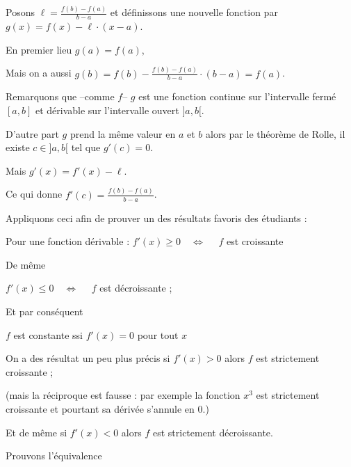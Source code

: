 Posons $\ell= \frac{f(b)-f(a)}{b-a}$ et définissons une nouvelle fonction
par $g(x) = f(x) - \ell \cdot (x-a)$.

\change

En premier lieu  $g(a)=f(a)$, 

\change

Mais on a aussi $g(b)=f(b)- \frac{f(b)-f(a)}{b-a} \cdot (b-a) = f(a)$.

\change

Remarquons que --comme $f$--
$g$ est une fonction continue sur l'intervalle fermé $[a,b]$ 
et dérivable sur l'intervalle ouvert $]a,b[$.


D'autre part $g$ prend la même valeur en $a$ et $b$
alors par le théorème de Rolle, 
il existe $c \in ]a,b[$ tel que $g'(c) =0$.

\change

Mais $g'(x) = f'(x) - \ell$.

\change

Ce qui donne $f'(c)= \frac{f(b)-f(a)}{b-a}$.  


\diapo

\change

Appliquons ceci afin de prouver un des résultats favoris des étudiants :

Pour une fonction dérivable :
$f'(x) \ge 0 \quad \iff \quad$ $f$ est croissante 

\change

De même 

 $f'(x) \le 0 \quad \iff \quad$ $f$ est décroissante ;

\change

Et par conséquent 

$f$ est constante ssi $f'(x) = 0$ pour tout $x$

\change

On a des résultat un peu plus précis si $f'(x) > 0$
alors  $f$ est strictement croissante ;

(mais la réciproque est fausse : par exemple 
la fonction $x^3$ est strictement croissante et pourtant sa dérivée s'annule en $0$.)

\change

Et de même si $f'(x) < 0$ alors $f$ est strictement décroissante.



\diapo

Prouvons l'équivalence 

